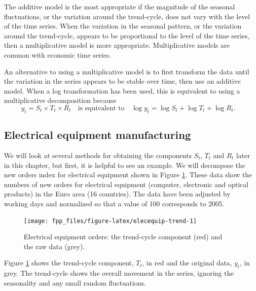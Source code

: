 \documentclass[]{book}
\begin{document}
The additive model is the most appropriate if the magnitude of the seasonal fluctuations, or the variation around the trend-cycle, does not vary with the level of the time series. When the variation in the seasonal pattern, or the variation around the trend-cycle, appears to be proportional to the level of the time series, then a multiplicative model is more appropriate. Multiplicative models are common with economic time series.

An alternative to using a multiplicative model is to first transform the data until the variation in the series appears to be stable over time, then use an additive model. When a log transformation has been used, this is equivalent to using a multiplicative decomposition because
\[
  y_{t} = S_{t} \times T_{t} \times R_t \quad\text{is equivalent to}\quad
  \log y_{t} = \log S_{t} + \log T_{t} + \log R_t.
\]

\hypertarget{electrical-equipment-manufacturing}{%
\subsection*{Electrical equipment manufacturing}\label{electrical-equipment-manufacturing}}

We will look at several methods for obtaining the components \(S_{t}\), \(T_{t}\) and \(R_{t}\) later in this chapter, but first, it is helpful to see an example. We will decompose the new orders index for electrical equipment shown in Figure \ref{fig:elecequip-trend}. These data show the numbers of new orders for electrical equipment (computer, electronic and optical products) in the Euro area (16 countries). The data have been adjusted by working days and normalized so that a value of 100 corresponds to 2005.

\begin{figure}

{\centering \texttt{[image: fpp\_files/figure-latex/elecequip-trend-1]} 

}

\caption{Electrical equipment orders: the trend-cycle component (red) and the raw data (grey).}\label{fig:elecequip-trend}
\end{figure}

Figure \ref{fig:elecequip-trend} shows the trend-cycle component, \(T_t\), in red and the original data, \(y_t\), in grey. The trend-cycle shows the overall movement in the series, ignoring the seasonality and any small random fluctuations.
\end{document}
